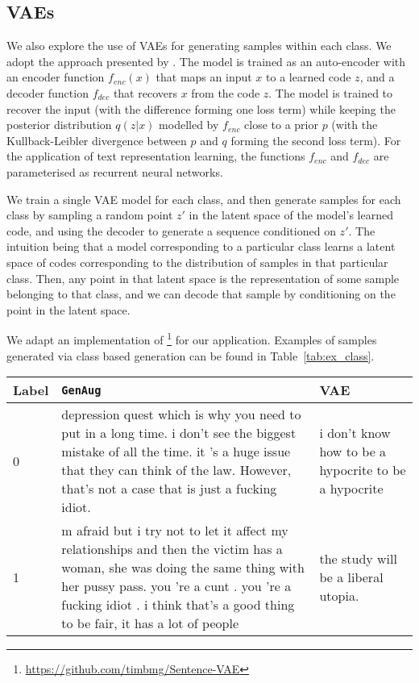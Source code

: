 \documentclass[11pt,a4paper]{article}
\begin{document}
\subsection{VAEs} \label{sec:vae_gen}
We also explore the use of VAEs for generating samples within each class. We adopt the approach presented by \citet{bowman-etal-2016-generating}. The model is trained as an auto-encoder with an encoder function $f_{enc}(x)$ that maps an input $x$ to a learned code $z$, and a decoder function $f_{dec}$ that recovers $x$ from the code $z$. The model is trained to recover the input (with the difference forming one loss term) while keeping the posterior distribution $q(z|x)$ modelled by $f_{enc}$ close to a prior $p$ (with the Kullback-Leibler divergence between $p$ and $q$ forming the second loss term). For the application of text representation learning, the functions $f_{enc}$ and $f_{dec}$ are parameterised as recurrent neural networks.

We train a single VAE model for each class, and then generate samples for each class by sampling a random point $z'$ in the latent space of the model's learned code, and using the decoder to generate a sequence conditioned on $z'$. The intuition being that a model corresponding to a particular class learns a latent space of codes corresponding to the distribution of samples in that particular class. Then, any point in that latent space is the representation of some sample belonging to that class, and we can decode that sample by conditioning on the point in the latent space.

We adapt an implementation of \citet{bowman-etal-2016-generating}\footnote{\url{https://github.com/timbmg/Sentence-VAE}} for our application. Examples of samples generated via class based generation can be found in Table~\ref{tab:ex_class}.

\label{tab:ex_class}
\begin{table*}
    \centering
    \begin{tabular}{lp{}p{}}
    \toprule
    \textbf{Label} & \textbf{\texttt{GenAug}} & \textbf{VAE} \\
    \midrule
        0 & depression quest which is why you need to put in a long time. i don't see the biggest mistake of all the time. it 's a huge issue that they can think of the law. However, that's not a case that is just a fucking idiot. & i don't know how to be a hypocrite to be a hypocrite \\
    \midrule
        1 & m afraid but i try not to let it affect my relationships and then the victim has a woman, she was doing the same thing with her pussy pass. you 're a cunt . you 're a fucking idiot . i think that's a good thing to be fair, it has a lot of people  &  the study will be a liberal utopia.\\
    \bottomrule
    \end{tabular}
    \caption{Samples obtained using class-based generation methods for augmentation. Label 0 indicates `not hate speech' and label 1 indicates `is hate speech'.}
    \label{tab:cbaug}
\end{table*}
\end{document}
